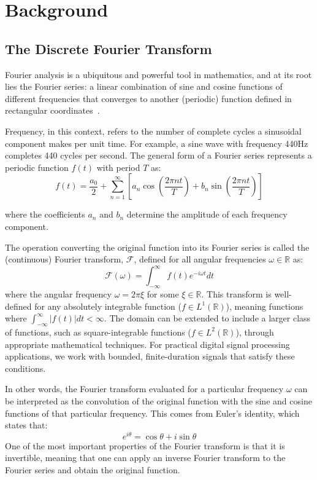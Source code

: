 \documentclass[11pt,twoside]{report}
\numberwithin{thm}{section}
\numberwithin{equation}{section}
\begin{document}
\chapter{Background}
\label{ch:1}
\section{The Discrete Fourier Transform}
Fourier analysis is a ubiquitous and powerful tool in mathematics, and at its root lies the Fourier series: a linear combination of sine and cosine functions of different frequencies that converges to another (periodic) function defined in rectangular coordinates~\cite{Lighthill_1958}.

Frequency, in this context, refers to the number of complete cycles a sinusoidal component makes per unit time. For example, a sine wave with frequency 440Hz completes 440 cycles per second. The general form of a Fourier series represents a periodic function $f(t)$ with period $T$ as:
\begin{equation}
  f(t) = \frac{a_0}{2} + \sum_{n=1}^{\infty} \left[ a_n \cos\left(\frac{2\pi nt}{T}\right) + b_n \sin\left(\frac{2\pi nt}{T}\right) \right]  
\end{equation}

where the coefficients $a_n$ and $b_n$ determine the amplitude of each frequency component.

The operation converting the original function into its Fourier series is called the (continuous) Fourier transform, $\mathcal{F}$, defined for all angular frequencies $\omega \in \mathbb{R}$ as: 
\begin{equation}
  \mathcal{F}(\omega) = \int_{-\infty}^\infty f(t) e^{-i\omega t}dt  
\end{equation}
where the angular frequency $\omega = 2\pi\xi$ for some $\xi \in \mathbb{R}$. This transform is well-defined for any absolutely integrable function ($f \in L^1(\mathbb{R})$), meaning functions where $\int_{-\infty}^{\infty} |f(t)| dt < \infty$. The domain can be extended to include a larger class of functions, such as square-integrable functions ($f \in L^2(\mathbb{R})$), through appropriate mathematical techniques. For practical digital signal processing applications, we work with bounded, finite-duration signals that satisfy these conditions.

 In other words, the Fourier transform evaluated for a particular frequency $\omega$ can be interpreted as the convolution of the original function with the sine and cosine functions of that particular frequency. This comes from Euler's identity, which states that:
 \begin{equation}
  e^{i\theta} = \cos\theta + i\sin\theta   
 \end{equation}
 One of the most important properties of the Fourier transform is that it is invertible, meaning that one can apply an inverse Fourier transform to the Fourier series and obtain the original function.
\end{document}
